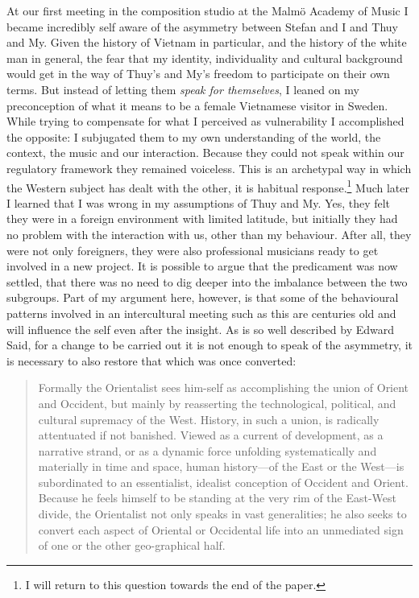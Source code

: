 \documentclass[a4paper]{article}
\begin{document}
At our first meeting in the composition studio at the Malmö Academy of Music I became incredibly self aware of the asymmetry between Stefan and I and Thuy and My. Given the history of Vietnam in particular, and the history of the white man in general, the fear that my identity, individuality and cultural background would get in the way of Thuy's and My's freedom to participate on their own terms. But instead of letting them 
\emph{speak for themselves}, I leaned on my preconception of what it means to be a female Vietnamese visitor in Sweden. While trying to compensate for what I perceived as vulnerability I accomplished the opposite: I subjugated them to my own understanding of the world, the context, the music and our interaction. Because they could not speak within our regulatory framework they remained voiceless. This is an archetypal way in which the Western subject has dealt with the other, it is habitual response.\footnote{I will return to this question towards the end of the paper.} Much later I learned that I was wrong in my assumptions of Thuy and My. Yes, they felt they were in a foreign environment with limited latitude, but initially they had no problem with the interaction with us, other than my behaviour. After all, they were not only foreigners, they were also professional musicians ready to get involved in a new project. It is possible to argue that the predicament was now settled, that there was no need to dig deeper into the imbalance between the two subgroups. Part of my argument here, however, is that some of the behavioural patterns involved in an intercultural meeting such as this are centuries old and will influence the self even after the insight. As is so well described by Edward Said, for a change to be carried out it is not enough to speak of the asymmetry, it is necessary to also restore that which was once converted: 

\begin{quote}
  Formally the Orientalist sees him-self as accomplishing the union of Orient
  and Occident, but mainly by reasserting the technological, political, and
  cultural supremacy of the West. History, in such a union, is radically
  attentuated if not banished. Viewed as a current of development, as a
  narrative strand, or as a dynamic force unfolding systematically and
  materially in time and space, human history—of the East or the West—is
  subordinated to an essentialist, idealist conception of Occident and
  Orient. Because he feels himself to be standing at the very rim of the
  East-West divide, the Orientalist not only speaks in vast generalities; he
  also seeks to convert each aspect of Oriental or Occidental life into an
  unmediated sign of one or the other geo-graphical
  half. \citep[246-7]{said1978}
\end{quote}
\end{document}
